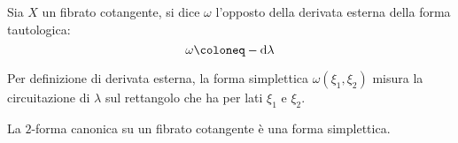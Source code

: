 \begin{definition}
  Sia $X$ un fibrato cotangente, si dice  $\omega$ l'opposto della derivata esterna della forma tautologica: \begin{equation}
  \omega \defeq -\dd{\lambda}
  \end{equation} 
\end{definition}
\begin{remark}
  Per definizione di derivata esterna, la forma simplettica $\omega(\xi_1,\xi_2)$ misura la circuitazione di $\lambda$ sul rettangolo che ha per lati $\xi_1$ e $\xi_2$. 
\end{remark}
\begin{theorem}
  La $2$-forma canonica su un fibrato cotangente è una forma simplettica.
\end{theorem}

